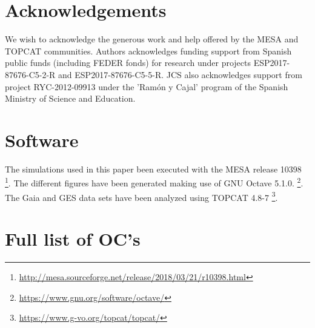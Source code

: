 \documentclass[fleqn,usenatbib]{mnras}
\begin{document}
\section*{Acknowledgements}
We wish to acknowledge the generous work and help offered by the MESA and TOPCAT communities. Authors acknowledges funding support from Spanish public funds (including FEDER fonds) for research under projects ESP2017-87676-C5-2-R and ESP2017-87676-C5-5-R. JCS also acknowledges support from project RYC-2012-09913 under the 'Ram\'on y Cajal' program of the Spanish Ministry of Science and Education.

\section*{Software}
The simulations used in this paper been executed with the MESA release 10398 \footnote{\url{http://mesa.sourceforge.net/release/2018/03/21/r10398.html}}. The different figures have been generated making use of GNU Octave 5.1.0. \footnote{\url{https://www.gnu.org/software/octave/}}. The Gaia and GES data sets have been analyzed using TOPCAT 4.8-7 \footnote{\url{https://www.g-vo.org/topcat/topcat/}}. 










\appendix
\section{Full list of OC's}
\end{document}
